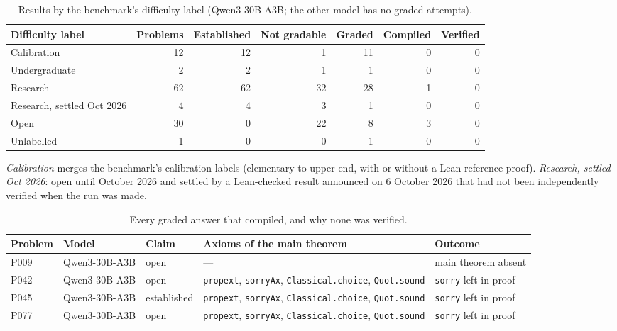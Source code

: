 \documentclass[11pt]{article}
\begin{document}
\begin{table}[!htbp]
\centering
\caption{Results by the benchmark's difficulty label (Qwen3-30B-A3B; the other model has no graded attempts).}
\label{tab:difficulty}
\small
\begin{tabular}{@{}lrrrrrr@{}}
\toprule
Difficulty label & Problems & Established & Not gradable & Graded & Compiled & Verified \\
\midrule
Calibration & 12 & 12 & 1 & 11 & 0 & 0 \\
Undergraduate & 2 & 2 & 1 & 1 & 0 & 0 \\
Research & 62 & 62 & 32 & 28 & 1 & 0 \\
Research, settled Oct 2026 & 4 & 4 & 3 & 1 & 0 & 0 \\
Open & 30 & 0 & 22 & 8 & 3 & 0 \\
Unlabelled & 1 & 0 & 0 & 1 & 0 & 0 \\
\bottomrule
\end{tabular}
\par\smallskip\parbox{0.9\linewidth}{\footnotesize \textit{Calibration} merges the benchmark's calibration labels (elementary to upper-end, with or without a Lean reference proof). \textit{Research, settled Oct 2026}: open until October 2026 and settled by a Lean-checked result announced on 6 October 2026 that had not been independently verified when the run was made.}
\end{table}

\begin{table}[!htbp]
\centering
\caption{Every graded answer that compiled, and why none was verified.}
\label{tab:compiled}
\small
\begin{tabular}{@{}lll>{\raggedright\arraybackslash}p{4.6cm}l@{}}
\toprule
Problem & Model & Claim & Axioms of the main theorem & Outcome \\
\midrule
P009 & Qwen3-30B-A3B & open & --- & main theorem absent \\
P042 & Qwen3-30B-A3B & open & \texttt{propext}, \texttt{sorryAx}, \texttt{Classical.choice}, \texttt{Quot.sound} & \texttt{sorry} left in proof \\
P045 & Qwen3-30B-A3B & established & \texttt{propext}, \texttt{sorryAx}, \texttt{Classical.choice}, \texttt{Quot.sound} & \texttt{sorry} left in proof \\
P077 & Qwen3-30B-A3B & open & \texttt{propext}, \texttt{sorryAx}, \texttt{Classical.choice}, \texttt{Quot.sound} & \texttt{sorry} left in proof \\
\bottomrule
\end{tabular}
\end{table}
\end{document}

